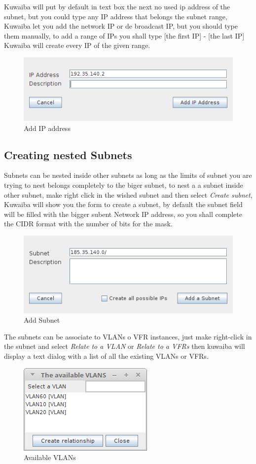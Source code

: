 \documentclass[a4paper]{article}
\begin{document}
		Kuwaiba will put by default in text box the next no used ip address of the subnet, but you could type any IP address that belongs the subnet range, Kuwaiba let you add the network IP or de broadcast IP, but you should type them manually, to add a range of IPs you shall type [the first IP] - [the last IP] Kuwaiba will create every IP of the given range. 
		\begin{figure}[h!]
			\centering
			\includegraphics[width=0.5\linewidth]{img/ipam_add_ip_address.png}
			\caption{Add IP address}
			\label{fig:ipam_add_ip_address}
		\end{figure}
	
	   	\subsection{Creating nested Subnets}
	   	
		Subnets can be nested inside other subnets as long as the limits of subnet you are trying to nest belongs  completely to the biger subnet, to nest a a subnet inside other subnet, make right click in the wished subnet and then select \textit{Create subnet}, Kuwaiba will show you the form to create a subnet, by default the subnet field will be filled with the bigger subent Network IP address, so you shall complete the CIDR format with the number of bits for the mask.
		\begin{figure}[h!]
			\centering
			\includegraphics[width=0.5\linewidth]{img/ipam_add_subsubnet.png}
			\caption{Add Subnet}
			\label{fig:ipam_add_subsubnet}
		\end{figure}
		
		
		The subnets can be associate to VLANs o VFR instances, just make right-click in the subnet and select \textit{Relate to a VLAN} or \textit{Relate to a VFRs} then kuwaiba will display a text dialog with a list of all the existing VLANs or VFRs.
		\begin{figure}[h!]
			\centering
			\includegraphics[width=0.3\linewidth]{img/ipam_available_vlans.png}
			\caption{Available VLANs}
			\label{fig:ipam_available_vlans}
		\end{figure}
		
\end{document}
